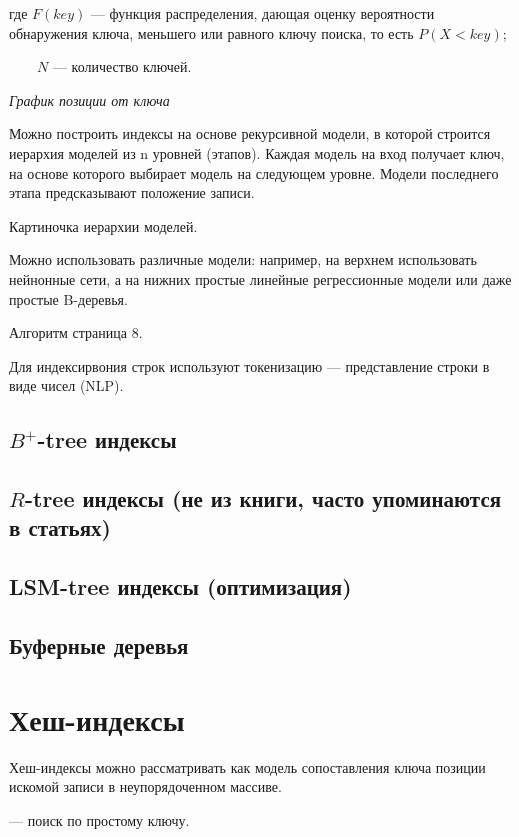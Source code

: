 где $F(key)$ --- функция распределения, дающая оценку вероятности обнаружения
ключа, меньшего или равного ключу поиска, то есть $P(X < key)$;

~~~~$N$ --- количество ключей.

\textit{График позиции от ключа}

Можно построить индексы на основе рекурсивной модели, в которой строится
иерархия моделей из n уровней (этапов). Каждая модель на вход получает ключ, на
основе которого выбирает модель на следующем уровне. Модели последнего этапа
предсказывают положение записи.

Картиночка иерархии моделей.

Можно использовать различные модели: например, на верхнем использовать нейнонные
сети, а на нижних простые линейные регрессионные модели или даже простые
B-деревья.

Алгоритм страница 8.

Для индексирвония строк используют токенизацию --- представление строки в виде
чисел (NLP).


\subsection{$B^+$-tree индексы}

\subsection{$R$-tree индексы (не из книги, часто упоминаются в статьях)}

\subsection{LSM-tree индексы (оптимизация)}

\subsection{Буферные деревья}


\section{Хеш-индексы}

Хеш-индексы можно рассматривать как модель сопоставления ключа позиции
искомой записи в неупорядоченном массиве.

 --- поиск по простому ключу.

